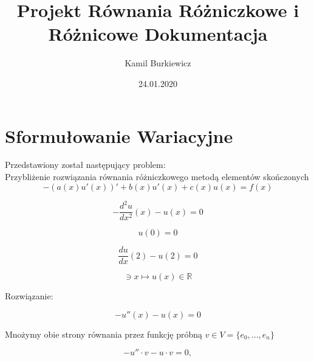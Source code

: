 \documentclass [dvipsnames] {article}
\title {Projekt Równania Różniczkowe i Różnicowe Dokumentacja}
\date {24.01.2020}
\author {Kamil Burkiewicz}
\begin{document}
	\maketitle
	\newpage

	\tableofcontents
	\newpage

	\section {Sformułowanie Wariacyjne}


	Przedstawiony został następujący problem:\\
	Przybliżenie rozwiązania równania różniczkowego metodą elementów skończonych
	\begin {equation*}
		-(a(x)u'(x))' + b(x)u'(x) + c(x)u(x) = f(x)
	\end {equation*}

	\begin {equation*}
		-\frac{d^2u}{d x^2}  (x) - u(x) = 0
	\end {equation*}	
	
	\begin {equation*}
		u(0) = 0
	\end {equation*}	
	
	\begin {equation*}
		\frac{du}{dx} (2) - u(2) = 0
	\end {equation*}	

	\begin {equation*}
		[0,2] \ni x \mapsto u(x) \in \mathbb{R}
	\end {equation*}
	
	Rozwiązanie:

	\begin {equation*}
		-u''(x) - u(x) = 0
	\end {equation*}
	
	\begin {center}
		Mnożymy obie strony równania przez funkcję próbną $v \in V = \{e_0, ..., e_n \}$
	\end {center}
	\begin {equation*}
		-u'' \cdot v - u \cdot v = 0,
	\end {equation*}
	
\end{document}
